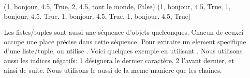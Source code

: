 \documentclass[letterpaper,10pt,french]{sphinxmanual}
\begin{document}
\begin{sphinxVerbatim}
\end{sphinxVerbatim}

\begin{sphinxVerbatim}[commandchars=\\\{\}]
     
     
 
\end{sphinxVerbatim}

\begin{sphinxVerbatim}[commandchars=\\\{\}]
(1, \PYGZsq{}bonjour\PYGZsq{}, 4.5, True, 2, 4.5, \PYGZsq{}tout le monde\PYGZsq{}, False)
(1, \PYGZsq{}bonjour\PYGZsq{}, 4.5, True, 1, \PYGZsq{}bonjour\PYGZsq{}, 4.5, True, 1, \PYGZsq{}bonjour\PYGZsq{}, 4.5, True, 1, \PYGZsq{}bonjour\PYGZsq{}, 4.5, True)
\end{sphinxVerbatim}

\sphinxAtStartPar
Les listes/tuples sont aussi une séquence d’objets quelconques. Chacun de ceux\sphinxhyphen{}ci occupe une place précise dans cette séquence. Pour extraire un element specifique d’une liste/tuple, on utilise \sphinxcode{\sphinxupquote{{[}{]}}}. Voici quelques exemple en utilisant . Nous utilisons aussi les indices négatifs: \sphinxhyphen{}1 désignera le dernier caractère, \sphinxhyphen{}2 l’avant dernier, et ainsi de suite. Nous utilisons le  aussi de la meme maniere que les chaines.
\end{document}
